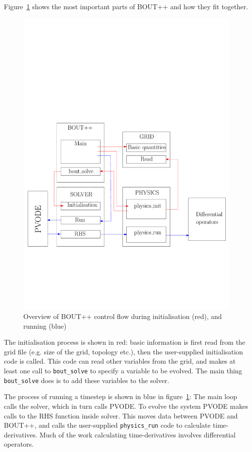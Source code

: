\documentclass[12pt]{article}
\newcommand{\code}[1]{\texttt{#1}}
\begin{document}
Figure~\ref{fig:layout1} shows the most important parts of BOUT++ and how they fit together.
\begin{figure}[htbp!]
\centering
\includegraphics[width=0.7\paperwidth, keepaspectratio]{figs/layout1.pdf}
\caption{Overview of BOUT++ control flow during initialisation (red), and running (blue)}
\label{fig:layout1}
\end{figure}
The initialisation process is shown in red: basic information is first read from the grid
file (e.g. size of the grid, topology etc.), then the user-supplied initialisation
code is called. This code can read other variables from the grid, and makes at least
one call
to \code{bout\_solve} to specify a variable to be evolved. The main thing \code{bout\_solve}
does is to add these variables to the solver. 

The process of running a timestep is shown in blue in figure~\ref{fig:layout1}:
The main loop calls the solver, which in turn calls PVODE. To evolve the system
PVODE makes calls to the RHS function inside solver. This moves data between PVODE
and BOUT++, and calls the user-supplied \code{physics\_run} code to calculate
time-derivatives. Much of the work calculating time-derivatives involves differential
operators.
\end{document}
